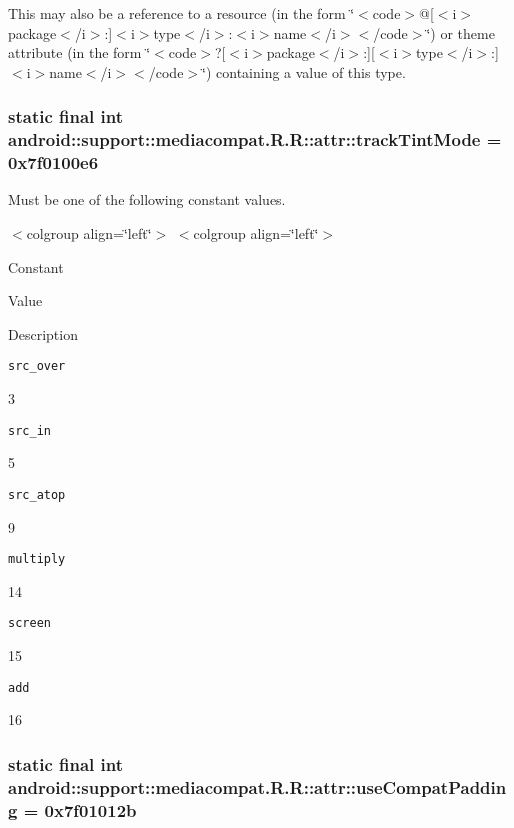 This may also be a reference to a resource (in the form \char`\"{}$<$code$>$@\mbox{[}$<$i$>$package$<$/i$>$:\mbox{]}$<$i$>$type$<$/i$>$:$<$i$>$name$<$/i$>$$<$/code$>$\char`\"{}) or theme attribute (in the form \char`\"{}$<$code$>$?\mbox{[}$<$i$>$package$<$/i$>$:\mbox{]}\mbox{[}$<$i$>$type$<$/i$>$:\mbox{]}$<$i$>$name$<$/i$>$$<$/code$>$\char`\"{}) containing a value of this type. \hypertarget{classandroid_1_1support_1_1mediacompat_1_1_r_1_1attr_d81dae9838d67b866589529106072f0e}{
\subsubsection[{trackTintMode}]{\setlength{\rightskip}{0pt plus 5cm}static final int android::support::mediacompat.R.R::attr::trackTintMode = 0x7f0100e6}}
\label{classandroid_1_1support_1_1mediacompat_1_1_r_1_1attr_d81dae9838d67b866589529106072f0e}


Must be one of the following constant values. \begin{TabularC}{0}
\hline
\end{TabularC}
$<$colgroup align=\char`\"{}left\char`\"{}$>$ $<$colgroup align=\char`\"{}left\char`\"{}$>$ 

Constant

Value

Description 

{\tt src\_\-over}

3

{\tt src\_\-in}

5

{\tt src\_\-atop}

9

{\tt multiply}

14

{\tt screen}

15

{\tt add}

16\hypertarget{classandroid_1_1support_1_1mediacompat_1_1_r_1_1attr_c3ea91168ca034cef1e88f44623626cb}{
\subsubsection[{useCompatPadding}]{\setlength{\rightskip}{0pt plus 5cm}static final int android::support::mediacompat.R.R::attr::useCompatPadding = 0x7f01012b}}
\label{classandroid_1_1support_1_1mediacompat_1_1_r_1_1attr_c3ea91168ca034cef1e88f44623626cb}


